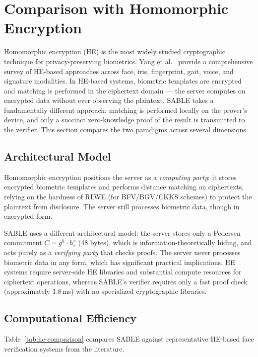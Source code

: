\documentclass[conference]{IEEEtran}
\begin{document}
\section{Comparison with Homomorphic Encryption}
\label{sec:he-comparison}

Homomorphic encryption (HE) is the most widely studied cryptographic technique for privacy-preserving biometrics. Yang et al.~\cite{yang2023} provide a comprehensive survey of HE-based approaches across face, iris, fingerprint, gait, voice, and signature modalities. In HE-based systems, biometric templates are encrypted and matching is performed in the ciphertext domain --- the server computes on encrypted data without ever observing the plaintext. SABLE takes a fundamentally different approach: matching is performed locally on the prover's device, and only a succinct zero-knowledge proof of the result is transmitted to the verifier. This section compares the two paradigms across several dimensions.

\subsection{Architectural Model}

Homomorphic encryption positions the server as a \emph{computing party}: it stores encrypted biometric templates and performs distance matching on ciphertexts, relying on the hardness of RLWE (for BFV/BGV/CKKS schemes) to protect the plaintext from disclosure. The server still processes biometric data, though in encrypted form.

SABLE uses a different architectural model: the server stores only a Pedersen commitment $C = g^h \cdot h_r^s$ (48 bytes), which is information-theoretically hiding, and acts purely as a \emph{verifying party} that checks proofs. The server never processes biometric data in any form, which has significant practical implications. HE systems require server-side HE libraries and substantial compute resources for ciphertext operations, whereas SABLE's verifier requires only a fast proof check (approximately 1.8\,ms) with no specialized cryptographic libraries.

\subsection{Computational Efficiency}

Table~\ref{tab:he-comparison} compares SABLE against representative HE-based face verification systems from the literature.
\end{document}
